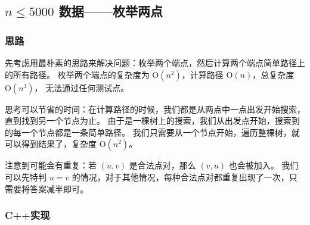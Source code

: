 
% 

\subsection{\texorpdfstring{$n \le 5000$}{n <= 5000} 数据——枚举两点}

\subsubsection{思路}

先考虑用最朴素的思路来解决问题：枚举两个端点，然后计算两个端点简单路径上的所有路径。
枚举两个端点的复杂度为 $\mathrm{O}(n^2)$，计算路径 $\mathrm{O}(n)$，总复杂度 $\mathrm{O}(n^3)$，
无法通过任何测试点。

思考可以节省的时间：在计算路径的时候，我们都是从两点中一点出发开始搜索，直到找到另一个节点为止。
由于是一棵树上的搜索，我们从出发点开始，搜索到的每一个节点都是一条简单路径。
我们只需要从一个节点开始，遍历整棵树，就可以得到结果了，复杂度 $\mathrm{O}(n^2)$。

注意到可能会有重复：若 $(u,v)$ 是合法点对，那么 $(v,u)$ 也会被加入。
我们可以先特判 $u=v$ 的情况，对于其他情况，每种合法点对都重复出现了一次，只需要将答案减半即可。

\subsubsection{C++实现}


